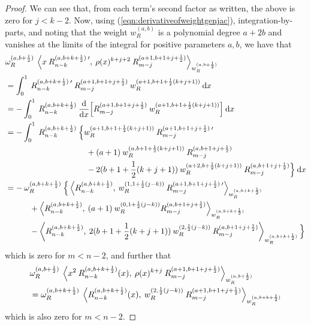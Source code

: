 \documentclass[11pt, oneside]{article}   	%
\newcommand{\half}{\frac{1}{2}}
\newcommand{\ddx}{\frac{\mathrm{d}}{\mathrm{d}x}}
\newcommand{\genjac}{R}
\newcommand{\genjacnmk}{\genjac_{n-k}}
\newcommand{\genjacmmj}{\genjac_{m-j}}
\newcommand{\genjacw}{w_\genjac}
\newcommand{\normgenjac}{\omega_\genjac}
\begin{document}
\begin{proof}
We can see that, from each term's second factor as written, the above is zero for $j < k-2$. Now, using (\ref{eqn:derivativeofweightgenjac}), integration-by-parts, and noting that the weight $\genjacw^{(a,b)}$ is a polynomial degree $a+2b$ and vanishes at the limits of the integral for positive parameters $a,b$, we have that
\begin{align*}
	&\normgenjac^{(a, b+\half)} \: \ip< x \: \genjacnmk^{(a, b+k+\half) \: \prime}, \: \rho(x)^{k+j+2} \: \genjacmmj^{(a+1, b+1+j+\half)} >_{\genjacw^{(a, b+\half)}}  \\
	&= \int_0^1 \: \genjacnmk^{(a, b+k+\half) \: \prime} \: \genjacmmj^{(a+1, b+1+j+\half)} \: \genjacw^{(a+1, b+1+\half(k+j+1))} \: \D x \\
	&= - \int_0^1 \: \genjacnmk^{(a, b+k+\half)} \: \ddx \Big[ \genjacmmj^{(a+1, b+1+j+\half)} \: \genjacw^{(a+1, b+1+\half(k+j+1))} \Big] \: \D x \\
	&= - \int_0^1 \: \genjacnmk^{(a, b+k+\half)} \: \Big\{ \genjacw^{(a+1, b+1+\half(k+j+1))} \: \genjacmmj^{(a+1, b+1+j+\half) \: \prime} \\
	&\quad \quad \quad \quad \quad \quad \quad \quad \quad \quad + (a+1) \: \genjacw^{(a, b+1+\half(k+j+1))} \: \genjacmmj^{(a, b+1+j+\half)} \\
	&\quad \quad \quad \quad \quad \quad \quad \quad \quad \quad -2(b+1+\half(k+j+1)) \: \genjacw^{(a+2, b+\half(k+j+1))} \: \genjacmmj^{(a, b+1+j+\half)} \Big\} \: \D x \\
	&= - \: \normgenjac^{(a,b+k+\half)} \:  \Big\{ \ip<\genjacnmk^{(a, b+k+\half)}, \: \genjacw^{(1, 1+\half(j-k))} \: \genjacmmj^{(a+1, b+1+j+\half) \: \prime}>_{\genjacw^{(a, b+k+\half)}} \\
		&\quad \quad \quad + \ip<\genjacnmk^{(a, b+k+\half)}, \: (a+1) \: \genjacw^{(0,1+\half(j-k))} \genjacmmj^{(a, b+1+j+\half)} >_{\genjacw^{(a, b+k+\half)}} \\
		&\quad \quad \quad - \ip<\genjacnmk^{(a, b+k+\half)}, \: 2(b+1+\half(k+j+1)) \: \genjacw^{(2, \half(j-k))} \: \genjacmmj^{(a, b+1+j+\half)} >_{\genjacw^{(a, b+k+\half)}} \Big\}
\end{align*}
which is zero for $m < n - 2$, and further that
\begin{align*}
	&\normgenjac^{(a, b+\half)} \: \ip< x^2 \: \genjacnmk^{(a, b+k+\half)}(x), \: \rho(x)^{k+j} \: \genjacmmj^{(a+1, b+1+j+\half)} >_{\genjacw^{(a, b+\half)}} \\
	&= \normgenjac^{(a, b+k+\half)} \: \ip< \genjacnmk^{(a, b+k+\half)}(x), \: \genjacw^{(2, \half(j-k))} \: \genjacmmj^{(a+1, b+1+j+\half)} >_{\genjacw^{(a, b+k+\half)}}
\end{align*}
which is also zero for $m < n - 2$.


\end{proof}
\end{document}

